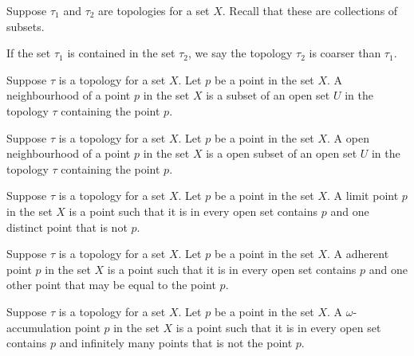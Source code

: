 \begin{definition}[Finer]
	\label{definition-finer}
	Suppose $\tau_1$ and $\tau_2$ are topologies for a set $X$.
	Recall that these are collections of subsets.
	
	If the set $\tau_1$ is contained in the set $\tau_2$, we say the topology 
	$\tau_2$ is coarser than $\tau_1$.
\end{definition}

\begin{definition}[Neighbourhood]
	\label{definition-neighbourhood}
	Suppose $\tau$ is a topology for a set $X$.
	Let $p$ be a point in the set $X$.
	A neighbourhood of a point $p$ in the set $X$ is a subset of an open set $U$ in the topology $\tau$ containing the point $p$.
\end{definition}

\begin{definition}
	\label{definition-open-neighbourhood}
	Suppose $\tau$ is a topology for a set $X$.
	Let $p$ be a point in the set $X$.
	A open neighbourhood of a point $p$ in the set $X$ is a open subset of an open set $U$ in the topology $\tau$ containing the point $p$.
\end{definition}

\begin{definition}
	\label{definition-limit-point}
	Suppose $\tau$ is a topology for a set $X$.
	Let $p$ be a point in the set $X$.
	A limit point $p$ in the set $X$ is a point such that it is in every open set contains $p$ and one distinct point that is not $p$.
\end{definition}

\begin{definition}
	\label{definition-adherent-point}
	Suppose $\tau$ is a topology for a set $X$.
	Let $p$ be a point in the set $X$.
	A adherent point $p$ in the set $X$ is a point such that it is in every open set contains $p$ and one other point that may be equal to the point $p$.
\end{definition}

\begin{definition}
	\label{definition-omega-accumulation-point}
	Suppose $\tau$ is a topology for a set $X$.
	Let $p$ be a point in the set $X$.
	A $\omega$-accumulation point $p$ in the set $X$ is a point such that it is in every open set contains $p$ and infinitely many points that is not the point $p$.
\end{definition}

